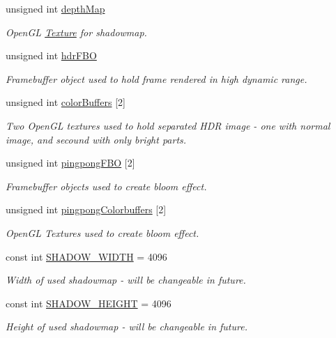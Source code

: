 \begin{DoxyCompactItemize}
unsigned int \mbox{\hyperlink{class_game_a61853261d678bcfe2638deba1e58fd18}{depth\+Map}}
\begin{DoxyCompactList}\small\item\em Open\+GL \mbox{\hyperlink{class_texture}{Texture}} for shadowmap. \end{DoxyCompactList}\item 
unsigned int \mbox{\hyperlink{class_game_aecf2b0705e36b7b510be741add10f974}{hdr\+F\+BO}}
\begin{DoxyCompactList}\small\item\em Framebuffer object used to hold frame rendered in high dynamic range. \end{DoxyCompactList}\item 
unsigned int \mbox{\hyperlink{class_game_af6b4374237efc5ae2586dd1b2a0304f3}{color\+Buffers}} \mbox{[}2\mbox{]}
\begin{DoxyCompactList}\small\item\em Two Open\+GL textures used to hold separated H\+DR image -\/ one with normal image, and secound with only bright parts. \end{DoxyCompactList}\item 
unsigned int \mbox{\hyperlink{class_game_a0160418629f882b089847e9ddd6901f5}{pingpong\+F\+BO}} \mbox{[}2\mbox{]}
\begin{DoxyCompactList}\small\item\em Framebuffer objects used to create bloom effect. \end{DoxyCompactList}\item 
unsigned int \mbox{\hyperlink{class_game_abbb66ef5bda6124f03272970cd18707f}{pingpong\+Colorbuffers}} \mbox{[}2\mbox{]}
\begin{DoxyCompactList}\small\item\em Open\+GL Textures used to create bloom effect. \end{DoxyCompactList}\item 
const int \mbox{\hyperlink{class_game_abf4d8e38c95fc6e1351e6dd85a19429f}{S\+H\+A\+D\+O\+W\+\_\+\+W\+I\+D\+TH}} = 4096
\begin{DoxyCompactList}\small\item\em Width of used shadowmap -\/ will be changeable in future. \end{DoxyCompactList}\item 
const int \mbox{\hyperlink{class_game_a6ff4bf491706f3c85c1de2ed7983a51b}{S\+H\+A\+D\+O\+W\+\_\+\+H\+E\+I\+G\+HT}} = 4096
\begin{DoxyCompactList}\small\item\em Height of used shadowmap -\/ will be changeable in future. \end{DoxyCompactList}\item 

\end{DoxyCompactItemize}
